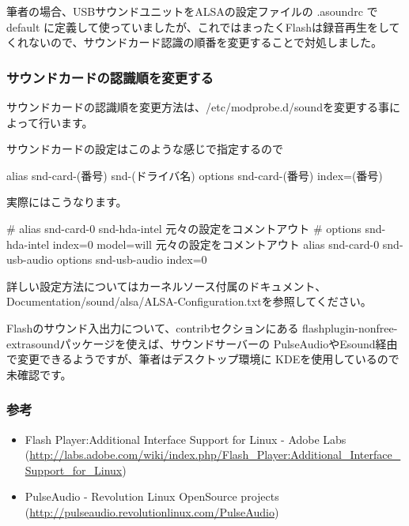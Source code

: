 \documentclass[mingoth,a4paper]{jsarticle}
\begin{document}
筆者の場合、USBサウンドユニットをALSAの設定ファイルの .asoundrc で
default に定義して使っていましたが、これではまったくFlashは録音再生をして
くれないので、サウンドカード認識の順番を変更することで対処しました。

\subsubsection{サウンドカードの認識順を変更する}

サウンドカードの認識順を変更方法は、/etc/modprobe.d/soundを変更する事に
よって行います。

サウンドカードの設定はこのような感じで指定するので

\begin{commandline}
alias snd-card-(番号) snd-(ドライバ名)
options snd-card-(番号) index=(番号)
\end{commandline}

実際にはこうなります。

\begin{commandline}
# alias snd-card-0 snd-hda-intel           元々の設定をコメントアウト
# options snd-hda-intel index=0 model=will 元々の設定をコメントアウト
alias snd-card-0 snd-usb-audio
options snd-usb-audio index=0
\end{commandline}

詳しい設定方法についてはカーネルソース付属のドキュメント、
Documentation/sound/alsa/ALSA-Configuration.txtを参照してください。

Flashのサウンド入出力について、contribセクションにある
flashplugin-nonfree-extrasoundパッケージを使えば、サウンドサーバーの
PulseAudioやEsound経由で変更できるようですが、筆者はデスクトップ環境に
KDEを使用しているので未確認です。

\subsubsection{参考}

\begin{itemize}
 \item Flash Player:Additional Interface Support for Linux - Adobe Labs \\
            (\url{http://labs.adobe.com/wiki/index.php/Flash_Player:Additional_Interface_Support_for_Linux})
 \item PulseAudio - Revolution Linux OpenSource projects \\
            (\url{http://pulseaudio.revolutionlinux.com/PulseAudio})
\end{itemize}
\end{document}
